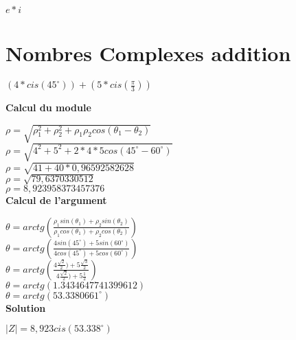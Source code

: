 $e*i $ \\

\newpage
\section{Nombres Complexes addition}
\vspace{3mm} %

$(4 * cis(45^{\circ} )) + (5 * cis(\frac{\pi}{3}))$

\vspace{10mm}
\textbf{Calcul du module}
\vspace{5mm}

$\rho = \sqrt{\rho_{1}^{2} + \rho_{2}^{2} + \rho_{1} \rho_{2} cos(\theta_{1} - \theta_{2}) }$ \\

$\rho = \sqrt{4^{2} + 5^{2} + 2 * 4 * 5 cos(45^{\circ} - 60^{\circ})}$ \\

$\rho = \sqrt{41 + 40 * 0,96592582628}$ \\

$\rho = \sqrt{79,6370330512}$ \\

$\rho = 8,923958373457376 $ \\

\vspace{6mm}
\textbf{Calcul de l'argument}
\vspace{5mm}

$\theta = arctg(\frac{\rho_{1}sin(\theta_{1}) + \rho_{2}sin(\theta_{2})} {\rho_{1}cos(\theta_{1}) + \rho_{2}cos(\theta_{2})} )$ \\

$\theta = arctg(\frac{4sin(45^{\circ}) + 5sin(60^{\circ})} {4cos(45^{\circ}) + 5cos(60^{\circ})} )$ \\

$\theta = arctg(\frac{4\frac{\sqrt{2}}{2}) + 5\frac{\sqrt{3}}{2} } {4\frac{\sqrt{2}}{2}) + 5\frac{1}{2}})$ \\

$\theta = arctg(1.3434647741399612)$ \\

$\theta = arctg(53.3380661^{\circ})$ \\

\vspace{6mm}
\textbf{Solution}
\vspace{5mm}

$|Z| = 8,923 cis(53.338^{\circ})$


